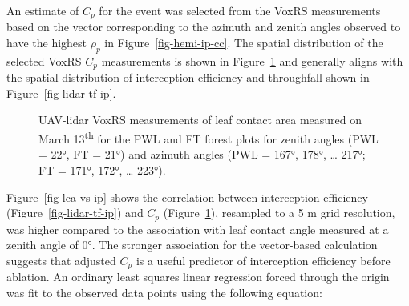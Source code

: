 \documentclass[
  letterpaper,
  DIV=11,
  numbers=noendperiod]{scrartcl}
\begin{document}
An estimate of \(C_p\) for the event was selected from the VoxRS
measurements based on the vector corresponding to the azimuth and zenith
angles observed to have the highest \(\rho_p\) in
Figure~\ref{fig-hemi-ip-cc}. The spatial distribution of the selected
VoxRS \(C_p\) measurements is shown in Figure~\ref{fig-lidar-cc-cp} and
generally aligns with the spatial distribution of interception
efficiency and throughfall shown in Figure~\ref{fig-lidar-tf-ip}.

\begin{figure}[H]


\caption{\label{fig-lidar-cc-cp}UAV-lidar VoxRS measurements of leaf
contact area measured on March 13\textsuperscript{th} for the PWL and FT
forest plots for zenith angles (PWL = 22°, FT = 21°) and azimuth angles
(PWL = 167°, 178°, \ldots{} 217°; FT = 171°, 172°, \ldots{} 223°).}

\end{figure}%

Figure~\ref{fig-lca-vs-ip} shows the correlation between interception
efficiency (Figure~\ref{fig-lidar-tf-ip}) and \(C_p\)
(Figure~\ref{fig-lidar-cc-cp}), resampled to a 5 m grid resolution, was
higher compared to the association with leaf contact angle measured at a
zenith angle of 0°. The stronger association for the vector-based
calculation suggests that adjusted \(C_p\) is a useful predictor of
interception efficiency before ablation. An ordinary least squares
linear regression forced through the origin was fit to the observed data
points using the following equation:
\end{document}
